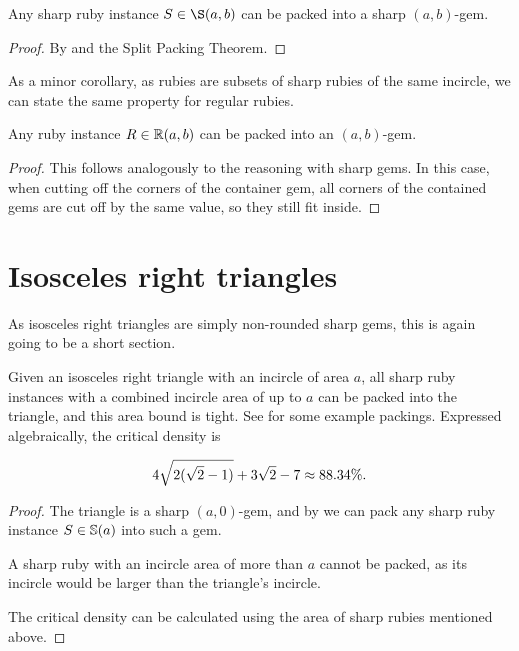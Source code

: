 \documentclass[a4paper,style=print,bibliography=totoc,nexus,lnum,extramargin]{tubsbook}
\begin{document}

\begin{theorem}\label{th:sharp-gem}
    Any sharp ruby instance $S \in \S(a,b)$ can be packed into a sharp $(a,b)$-gem.
\end{theorem}

\begin{proof}
    By  and the Split Packing Theorem.
\end{proof}

As a minor corollary, as rubies are subsets of sharp rubies of the same incircle, we can state the same property for regular rubies.

\begin{theorem}\label{th:gem}
    Any ruby instance $R \in \mathbb{R}(a,b)$ can be packed into an $(a,b)$-gem.
\end{theorem}

\begin{proof}
    This follows analogously to the reasoning with sharp gems. In this case, when cutting off the corners of the container gem, all corners of the contained gems are cut off by the same value, so they still fit inside.
\end{proof}

\section{Isosceles right triangles}

As isosceles right triangles are simply non-rounded sharp gems, this is again going to be a short section.

\begin{theorem}\label{th:iso-right}
    Given an isosceles right triangle with an incircle of area $a$, all sharp ruby instances with a combined incircle area of up to $a$ can be packed into the triangle, and this area bound is tight.
    See  for some example packings.
    Expressed algebraically, the critical density is

    $$4\sqrt{2(\sqrt{2}-1)} + 3\sqrt{2} -7 \approx 88.34\%.$$

\end{theorem}

\begin{proof}
    The triangle is a sharp $(a,0)$-gem, and by  we can pack any sharp ruby instance $S \in \mathbb{S}(a)$ into such a gem.

    A sharp ruby with an incircle area of more than $a$ cannot be packed, as its incircle would be larger than the triangle's incircle.

    The critical density can be calculated using the area of sharp rubies mentioned above.
\end{proof}
\end{document}
